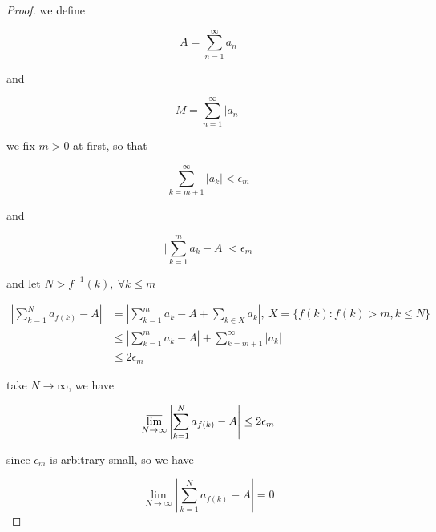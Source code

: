 \begin{proof}
    we define

    \[
        A = \sum_{n=1}^{\infty}a_n
    \]

    and


    \[
        M = \sum_{n=1}^{\infty} \lvert a_n \rvert
    \]

    we fix $m > 0$ at first, so that

    \[
        \sum_{k=m+1}^{\infty}\lvert a_k \rvert < \epsilon_m
    \]

    and

    \[
        \lvert \sum_{k=1}^{m}a_k - A \rvert < \epsilon_m
    \]
    
    and let $N > f^{-1}(k), \: \forall k \le m$  



    \begin{align*}
        \left| \sum_{k=1}^{N}a_{f(k)} - A \right| &= \left| \sum_{k=1}^{m}a_k - A + \sum_{k \in X}a_k \right|,\: X = \{ f(k): f(k) > m, k \le N \} \\
        & \le \left| \sum_{k=1}^{m}a_k - A \right| + \sum_{k=m+1}^{\infty} \lvert a_k\rvert \\
        & \le 2 \epsilon_m
    \end{align*}

    take $N \to \infty$, we have

    \[
        \varlimsup_{N \to \infty}\left| \sum_{k=1}^{N}a_{f(k)} - A \right| \le 2\epsilon_m
    \]

    since $\epsilon_m$ is arbitrary small, so we have

    \[
\lim_{N \to \infty}\left| \sum_{k=1}^{N}a_{f(k)} - A \right| = 0
    \]


\end{proof}